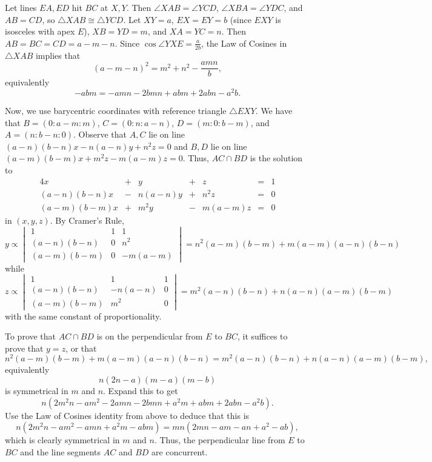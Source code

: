 Let lines $EA,ED$ hit $BC$ at $X,Y$. Then $\angle{XAB}=\angle{YCD}$, $\angle{XBA}=\angle{YDC}$, and $AB=CD$, so $\triangle{XAB}\cong\triangle{YCD}$. Let $XY=a$, $EX=EY=b$ (since $EXY$ is isosceles with apex $E$), $XB=YD=m$, and $XA=YC=n$. Then $AB=BC=CD=a-m-n$. Since $\cos\angle{YXE}=\frac{a}{2b}$, the Law of Cosines in $\triangle{XAB}$ implies that \[\left(a-m-n\right)^2=m^2+n^2-\frac{amn}{b},\] equivalently \[-abm=-amn-2bmn+abm+2abn-a^2b.\]

Now, we use barycentric coordinates with reference triangle $\triangle{EXY}$. We have that $B=\left(0:a-m:m\right)$, $C=\left(0:n:a-n\right)$, $D=\left(m:0:b-m\right)$, and $A=\left(n:b-n:0\right)$. Observe that $A,C$ lie on line $\left(a-n\right)\left(b-n\right)x-n\left(a-n\right)y+n^2z=0$ and $B,D$ lie on line $\left(a-m\right)\left(b-m\right)x+m^2z-m\left(a-m\right)z=0$. Thus, $AC\cap BD$ is the solution to
\begin{alignat*}{4}
	x & {}+{} & y & {}+{} & z & {}={} & 1\\
	\left(a-n\right)\left(b-n\right)x & {}-{} & n\left(a-n\right)y & {}+{} & n^2z & {}={} & 0\\
	\left(a-m\right)\left(b-m\right)x & {}+{} & m^2y & {}-{} & m\left(a-m\right)z & {}={} & 0
\end{alignat*}
in $\left(x,y,z\right)$. By Cramer's Rule, \[y\propto
\begin{vmatrix}
	1 & 1 & 1 \\
	\left(a-n\right)\left(b-n\right) & 0 & n^2 \\
	\left(a-m\right)\left(b-m\right) & 0 & -m\left(a-m\right)
\end{vmatrix}=
n^2\left(a-m\right)\left(b-m\right)+m\left(a-m\right)\left(a-n\right)\left(b-n\right)\] while \[z\propto
\begin{vmatrix}
	1 & 1 & 1 \\
	\left(a-n\right)\left(b-n\right) & -n\left(a-n\right) & 0 \\
	\left(a-m\right)\left(b-m\right) & m^2 & 0
\end{vmatrix}=
m^2\left(a-n\right)\left(b-n\right)+n\left(a-n\right)\left(a-m\right)\left(b-m\right)\] with the same constant of proportionality.

To prove that $AC\cap BD$ is on the perpendicular from $E$ to $BC$, it suffices to prove that $y=z$, or that \[n^2\left(a-m\right)\left(b-m\right)+m\left(a-m\right)\left(a-n\right)\left(b-n\right)=m^2\left(a-n\right)\left(b-n\right)+n\left(a-n\right)\left(a-m\right)\left(b-m\right),\] equivalently \[n\left(2n-a\right)\left(m-a\right)\left(m-b\right)\] is symmetrical in $m$ and $n$. Expand this to get \[n\left(2m^2n-am^2-2amn-2bmn+a^2m+abm+2abn-a^2b\right).\] Use the Law of Cosines identity from above to deduce that this is \[n\left(2m^2n-am^2-amn+a^2m-abm\right)=mn\left(2mn-am-an+a^2-ab\right),\] which is clearly symmetrical in $m$ and $n$. Thus, the perpendicular line from $E$ to $BC$ and the line segments $AC$ and $BD$ are concurrent.